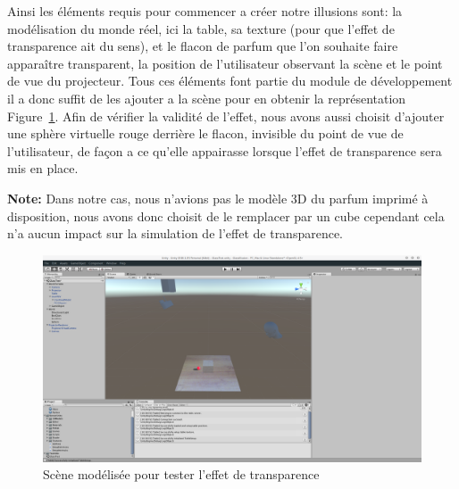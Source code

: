 Ainsi les éléments requis pour commencer a créer notre illusions sont: la modélisation du monde réel, ici la table, sa texture (pour que l'effet de transparence ait du sens), et le flacon de parfum que l'on souhaite faire apparaître transparent, la position de l'utilisateur observant la scène et le point de vue du projecteur. Tous ces éléments font partie du module de développement il a donc suffit de les ajouter a la scène pour en obtenir la représentation Figure~\ref{fig:unity:projscene}.
Afin de vérifier la validité de l'effet, nous avons aussi choisit d'ajouter une sphère virtuelle rouge derrière le flacon, invisible du point de vue de l'utilisateur, de façon a ce qu'elle appairasse lorsque l'effet de transparence sera mis en place.

\textbf{Note:} Dans notre cas, nous n'avions pas le modèle 3D du parfum imprimé à disposition, nous avons donc choisit de le remplacer par un cube cependant cela n'a aucun impact sur la simulation de l'effet de transparence.

\begin{figure}[H]
\centering
\includegraphics[width=0.75\linewidth, trim = 12cm 12cm 20cm 4.5cm, clip]{images/Unity-Projection-RealScene}
\caption{Scène modélisée pour tester l'effet de transparence}
\label{fig:unity:projscene}
\end{figure}

